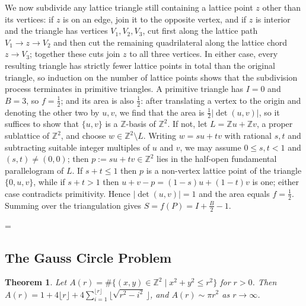 \documentclass[11pt]{article}
\makeatletter
\theoremstyle{ntstyle}
\newtheorem{theorem}{Theorem}[subsection]
\let\nt@closedisplay\]
\def\nt@guardedclose{\@ifnextchar\par{\nt@closeafterpar}{\@ifnextchar\end{\postdisplaypenalty\@M\nt@closedisplay}{\nt@closedisplay}}}
\def\nt@closeafterpar\par{\@ifnextchar\par{\nt@closeafterpar}{\@ifnextchar\end{\postdisplaypenalty\@M\nt@closedisplay\par}{\nt@closedisplay\par}}}
\renewenvironment{proof}[1][\proofname]{\par
  \pushQED{\qed}\normalfont\topsep\medskipamount\edef\nt@afterproof{\@endparpenalty=\the\@endparpenalty\relax}\@beginparpenalty\@M\@endparpenalty\@M\let\]\nt@guardedclose\trivlist\item[]\textit{#1\@addpunct{.}} \ignorespaces}{\ifvmode\addpenalty\@M\fi\popQED\nt@afterproof\endtrivlist\@endpefalse}
\makeatother
\begin{document}
\begin{proof}
	We now subdivide any lattice triangle still containing a lattice point
	$z$ other than its vertices: if $z$ is on an edge, join it to the opposite
	vertex, and if $z$ is interior and the triangle has vertices
	$V_1,V_2,V_3$, cut first along the lattice path
	$V_1 \to z \to V_2$ and then cut the remaining quadrilateral along the lattice
	chord $z \to V_3$; together these cuts join $z$ to all three vertices. In
	either case, every resulting triangle has strictly fewer lattice
	points in total than the original triangle, so induction on the number of lattice
	points shows that the subdivision process terminates in primitive
	triangles. A primitive triangle has $I = 0$ and $B = 3$, so $f =
		\tfrac{1}{2}$; and its area is also $\tfrac{1}{2}$: after translating a vertex to
	the origin and denoting the other two by $u,v$, we find that the area is
	$\tfrac{1}{2}|\det(u,v)|$, so it suffices to show that $\{u,v\}$ is a
	$\mathbb{Z}$-basis of $\mathbb{Z}^2$. If not, let
	$L=\mathbb{Z}u+\mathbb{Z}v$, a proper sublattice of $\mathbb{Z}^2$, and
	choose $w\in\mathbb{Z}^2\setminus L$. Writing $w=su+tv$ with rational
	$s,t$ and subtracting suitable integer multiples of $u$ and $v$, we
	may assume $0\le s,t<1$ and $(s,t)\neq(0,0)$; then
	$p:=su+tv\in\mathbb{Z}^2$ lies in the half-open fundamental
	parallelogram of $L$. If $s+t\le1$ then $p$ is a non-vertex lattice
	point of the triangle $\{0,u,v\}$, while if $s+t>1$ then
	$u+v-p=(1-s)u+(1-t)v$ is one; either case contradicts
	primitivity. Hence $|\det(u,v)|=1$ and the area equals $f=\tfrac{1}{2}$.
	Summing over the triangulation gives $S = f(P) = I + \tfrac{B}{2} -
		1$.

\end{proof}
\subsection{The Gauss Circle Problem}

\begin{theorem}\label{thm:10.9.1} Let $A(r) =
		\#\{(x,y)\in\mathbb{Z}^2 \mid x^2 + y^2 \le r^2\}$ for $r>0$. Then $A(r)
		= 1 + 4\lfloor r\rfloor + 4\sum_{i=1}^{\lfloor r\rfloor}\big\lfloor
		\sqrt{r^2 - i^2}\,\big\rfloor$, and $A(r) \sim \pi r^2$ as $r\to\infty$.

\end{theorem}
\end{document}

